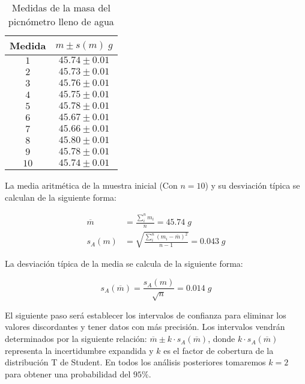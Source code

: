 \documentclass[a4paper,12pt,titlepage]{article}
\begin{document}
\begin{table}[h!]
    \centering
    \begin{tabular}{|c|c|}
    \hline
    Medida & $m \pm s(m)\; g$  \\ \hline
    $1$    & $45.74 \pm 0.01$ \\ \hline
    $2$    & $45.73 \pm 0.01$ \\ \hline
    $3$    & $45.76 \pm 0.01$ \\ \hline
    $4$    & $45.75 \pm 0.01$ \\ \hline
    $5$    & $45.78 \pm 0.01$ \\ \hline
    $6$    & $45.67 \pm 0.01$ \\ \hline
    $7$    & $45.66 \pm 0.01$ \\ \hline
    $8$    & $45.80 \pm 0.01$ \\ \hline
    $9$    & $45.78 \pm 0.01$ \\ \hline
    $10$   & $45.74 \pm 0.01$ \\ \hline
    \end{tabular}
    \caption{Medidas de la masa del picnómetro lleno de agua}
    \label{Pic Agua}
    \end{table}

La media aritmética de la muestra inicial (Con $n=10$) y su desviación típica se calculan de la siguiente forma:

\begin{align}
    \overline{m} &= \frac{\sum_{i}^n m_{i}}{n} = 45.74 \; g 
    \label{Media1} \\
    s_{A}(m) &= \sqrt{\frac{\sum_{i}^n (m_i-\overline{m})^2}{n-1}} = 0.043 \; g
    \label{Desviación Típica de la muestra}
\end{align}

La desviación típica de la media se calcula de la siguiente forma:

\begin{equation}
    s_{A}(\overline{m}) = \frac{s_{A}(m)}{\sqrt{n}} = 0.014 \; g
    \label{Desv_T_agua}
\end{equation}


El siguiente paso será establecer los intervalos de confianza para eliminar los valores discordantes y tener datos con más precisión. Los intervalos vendrán determinados por la siguiente relación: $\overline{m} \pm k \cdot s_{A}(\overline{m})$, donde $k \cdot s_{A}(\overline{m})$ representa la incertidumbre expandida y $k$ es el factor de cobertura de la distribución T de Student. En todos los análisis posteriores tomaremos $k=2$ para obtener una probabilidad del $95 \%$.
\end{document}
